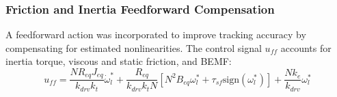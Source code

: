 \subsubsection{Friction and Inertia Feedforward Compensation}
A feedforward action was incorporated to improve tracking accuracy by compensating for estimated nonlinearities. The control signal $u_{ff}$ accounts for inertia torque, viscous and static friction, and BEMF:
\begin{equation}
    u_{ff} = \frac{N R_{eq} J_{eq}}{k_{drv} k_t} \dot{\omega}_l^* + \frac{R_{eq}}{k_{drv} k_t N} [N^2 B_{eq} \omega_l^* + \tau_{sf} \text{sign}(\omega_l^*)] + \frac{N k_e}{k_{drv}} \omega_l^*
\end{equation}